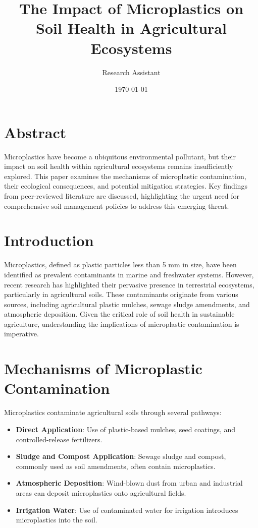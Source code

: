 \documentclass[12pt]{article}
\title{The Impact of Microplastics on Soil Health in Agricultural Ecosystems}
\author{Research Assistant}
\date{\today}
\begin{document}
\maketitle

\section*{Abstract}

Microplastics have become a ubiquitous environmental pollutant, but their impact on soil health within agricultural ecosystems remains insufficiently explored. This paper examines the mechanisms of microplastic contamination, their ecological consequences, and potential mitigation strategies. Key findings from peer-reviewed literature are discussed, highlighting the urgent need for comprehensive soil management policies to address this emerging threat.

\section{Introduction}

Microplastics, defined as plastic particles less than 5 mm in size, have been identified as prevalent contaminants in marine and freshwater systems. However, recent research has highlighted their pervasive presence in terrestrial ecosystems, particularly in agricultural soils. These contaminants originate from various sources, including agricultural plastic mulches, sewage sludge amendments, and atmospheric deposition. Given the critical role of soil health in sustainable agriculture, understanding the implications of microplastic contamination is imperative.

\section{Mechanisms of Microplastic Contamination}

Microplastics contaminate agricultural soils through several pathways:
\begin{itemize}
    \item \textbf{Direct Application}: Use of plastic-based mulches, seed coatings, and controlled-release fertilizers.
    \item \textbf{Sludge and Compost Application}: Sewage sludge and compost, commonly used as soil amendments, often contain microplastics.
    \item \textbf{Atmospheric Deposition}: Wind-blown dust from urban and industrial areas can deposit microplastics onto agricultural fields.
    \item \textbf{Irrigation Water}: Use of contaminated water for irrigation introduces microplastics into the soil.
\end{itemize}
\end{document}
